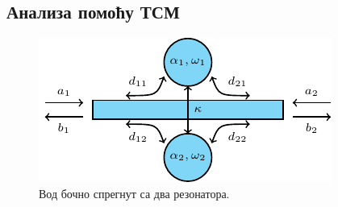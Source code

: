 \subsection{Анализа помоћу ТСМ}\label{tsm:sec:cmt}
\begin{figure}
\centering
\includegraphics[scale=1]{sl_tsm/smfig.pdf}
\caption{Вод бочно спрегнут са два резонатора.}
\label{tsm:smfig}
\end{figure}

